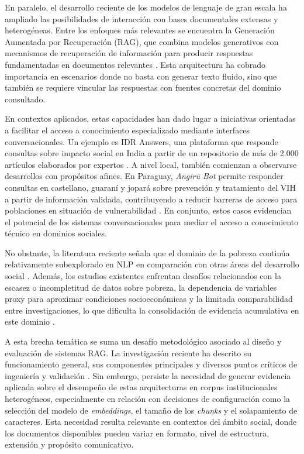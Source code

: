 \documentclass{article}
\begin{document}
En paralelo, el desarrollo reciente de los modelos de lenguaje de gran escala ha ampliado las posibilidades de interacción con bases documentales extensas y heterogéneas. Entre los enfoques más relevantes se encuentra la Generación Aumentada por Recuperación (RAG), que combina modelos generativos con mecanismos de recuperación de información para producir respuestas fundamentadas en documentos relevantes \cite{Lewis2020RAG}. Esta arquitectura ha cobrado importancia en escenarios donde no basta con generar texto fluido, sino que también se requiere vincular las respuestas con fuentes concretas del dominio consultado.

En contextos aplicados, estas capacidades han dado lugar a iniciativas orientadas a facilitar el acceso a conocimiento especializado mediante interfaces conversacionales. Un ejemplo es IDR Answers, una plataforma que responde consultas sobre impacto social en India a partir de un repositorio de más de 2.000 artículos elaborados por expertos \cite{idr_answers}. A nivel local, también comienzan a observarse desarrollos con propósitos afines. En Paraguay, \textit{Angirũ Bot} permite responder consultas en castellano, guaraní y jopará sobre prevención y tratamiento del VIH a partir de información validada, contribuyendo a reducir barreras de acceso para poblaciones en situación de vulnerabilidad \cite{angiru_bot}. En conjunto, estos casos evidencian el potencial de los sistemas conversacionales para mediar el acceso a conocimiento técnico en dominios sociales.

No obstante, la literatura reciente señala que el dominio de la pobreza continúa relativamente subexplorado en NLP en comparación con otras áreas del desarrollo social \cite{nlp_social_good_survey}. Además, los estudios existentes enfrentan desafíos relacionados con la escasez o incompletitud de datos sobre pobreza, la dependencia de variables proxy para aproximar condiciones socioeconómicas y la limitada comparabilidad entre investigaciones, lo que dificulta la consolidación de evidencia acumulativa en este dominio \cite{nlp_social_good_survey}.

A esta brecha temática se suma un desafío metodológico asociado al diseño y evaluación de sistemas RAG. La investigación reciente ha descrito su funcionamiento general, sus componentes principales y diversos puntos críticos de ingeniería y validación \cite{gao2023retrieval, barnett2024seven}. Sin embargo, persiste la necesidad de generar evidencia aplicada sobre el desempeño de estas arquitecturas en corpus institucionales heterogéneos, especialmente en relación con decisiones de configuración como la selección del modelo de \textit{embeddings}, el tamaño de los \textit{chunks} y el solapamiento de caracteres. Esta necesidad resulta relevante en contextos del ámbito social, donde los documentos disponibles pueden variar en formato, nivel de estructura, extensión y propósito comunicativo.
\end{document}

